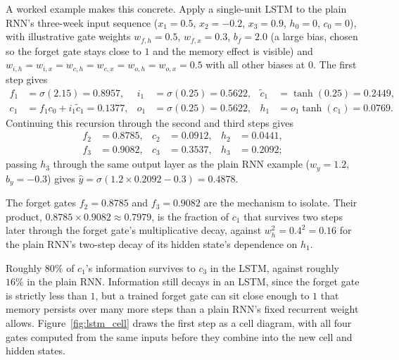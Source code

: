 \documentclass[../ai_in_finance]{subfiles}
\begin{document}
A worked example makes this concrete. Apply a single-unit LSTM to the plain RNN's three-week input sequence ($x_1=0.5$, $x_2=-0.2$, $x_3=0.9$, $h_0=0$, $c_0=0$), with illustrative gate weights $w_{f,h}=0.5$, $w_{f,x}=0.3$, $b_f=2.0$ (a large bias, chosen so the forget gate stays close to $1$ and the memory effect is visible) and $w_{i,h}=w_{i,x}=w_{c,h}=w_{c,x}=w_{o,h}=w_{o,x}=0.5$ with all other biases at $0$. The first step gives
\begin{align*}
f_1 &= \sigma(2.15) = 0.8957, & i_1 &= \sigma(0.25) = 0.5622, & \tilde c_1 &= \tanh(0.25) = 0.2449, \\
c_1 &= f_1 c_0 + i_1\tilde c_1 = 0.1377, & o_1 &= \sigma(0.25) = 0.5622, & h_1 &= o_1\tanh(c_1) = 0.0769.
\end{align*}
Continuing this recursion through the second and third steps gives
\begin{align*}
f_2 &= 0.8785, & c_2 &= 0.0912, & h_2 &= 0.0441, \\
f_3 &= 0.9082, & c_3 &= 0.3537, & h_3 &= 0.2092;
\end{align*}
passing $h_3$ through the same output layer as the plain RNN example ($w_y=1.2$, $b_y=-0.3$) gives $\hat y=\sigma(1.2 \times 0.2092 - 0.3)=0.4878$.

The forget gates $f_2=0.8785$ and $f_3=0.9082$ are the mechanism to isolate. Their product, $0.8785\times0.9082\approx0.7979$, is the fraction of $c_1$ that survives two steps later through the forget gate's multiplicative decay, against $w_h^2=0.4^2=0.16$ for the plain RNN's two-step decay of its hidden state's dependence on $h_1$.

Roughly $80\%$ of $c_1$'s information survives to $c_3$ in the LSTM, against roughly $16\%$ in the plain RNN. Information still decays in an LSTM, since the forget gate is strictly less than $1$, but a trained forget gate can sit close enough to $1$ that memory persists over many more steps than a plain RNN's fixed recurrent weight allows. Figure~\ref{fig:lstm_cell} draws the first step as a cell diagram, with all four gates computed from the same inputs before they combine into the new cell and hidden states.
\end{document}
